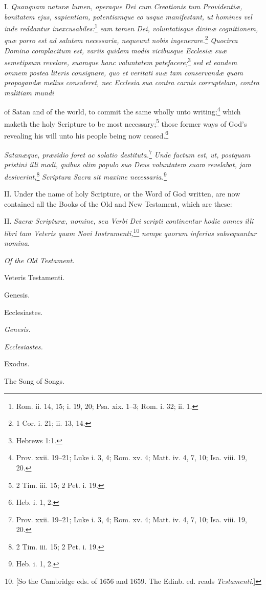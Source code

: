I. \emph{Quanquam naturæ lumen, operaque Dei cum Creationis tum Providentiæ, bonitatem ejus, sapientiam, potentiamque eo usque manifestant, ut homines vel inde reddantur inexcusabiles:}\footnote{Rom. ii. 14, 15;  i. 19, 20; Psa. xix. 1–3;  Rom. i. 32; ii. 1.}\emph{ eam tamen Dei, voluntatisque divinæ cognitionem, quæ porro est ad salutem necessaria, nequeunt nobis ingenerare.}\footnote{1 Cor. i. 21; ii. 13, 14.}\emph{ Quocirca Domino complacitum est, variis quidem modis vicibusque Ecclesiæ suæ semetipsum revelare, suamque hanc voluntatem patefacere;}\footnote{Hebrews 1:1.}\emph{ sed et eandem omnem postea literis consignare, quo et veritati suæ tam conservandæ quam propagandæ melius consuleret, nec Ecclesia sua contra carnis corruptelam, contra malitiam mundi}

of Satan and of the world, to commit the same wholly unto writing;\footnote{Prov. xxii. 19–21; Luke i. 3, 4;  Rom. xv. 4; Matt. iv. 4, 7, 10; Isa. viii. 19, 20.} which maketh the holy Scripture to be most necessary;\footnote{2 Tim. iii. 15; 2 Pet. i. 19.} those former ways of God's revealing his will unto his people being now ceased.\footnote{Heb. i. 1, 2.}

\emph{Satanæque, præsidio foret ac solatio destituta.}\footnote{Prov. xxii. 19–21; Luke i. 3, 4;  Rom. xv. 4; Matt. iv. 4, 7, 10; Isa. viii. 19, 20.}\emph{ Unde factum est, ut, postquam pristini illi modi, quibus olim populo suo Deus voluntatem suam revelabat, jam desiverint,}\footnote{2 Tim. iii. 15; 2 Pet. i. 19.}\emph{ Scriptura Sacra sit maxime necessaria.}\footnote{Heb. i. 1, 2.}

II. Under the name of holy Scripture, or the Word of God written, are now contained all the Books of the Old and New Testament, which are these:

II. \emph{Sacræ Scripturæ, nomine, seu Verbi Dei scripti continentur hodie omnes illi libri tam Veteris quam Novi Instrumenti,}\footnote{[So the Cambridge eds. of 1656 and 1659. The Edinb. ed. reads \emph{Testamenti}.]} \emph{nempe quorum inferius subsequuntur nomina.}

\emph{Of the Old Testament.}

Veteris Testamenti.

Genesis.

Ecclesiastes.

\emph{Genesis.}

\emph{Ecclesiastes.}

Exodus.

The Song of Songs.

